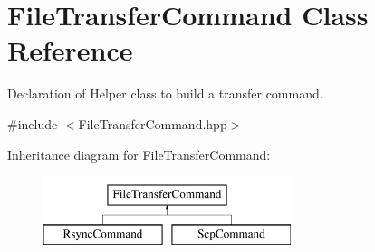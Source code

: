 \hypertarget{classFileTransferCommand}{
\section{FileTransferCommand Class Reference}
\label{classFileTransferCommand}
}


Declaration of Helper class to build a transfer command.  




{\ttfamily \#include $<$FileTransferCommand.hpp$>$}

Inheritance diagram for FileTransferCommand:\begin{figure}[H]
\begin{center}
\leavevmode
\includegraphics[height=2.000000cm]{classFileTransferCommand}
\end{center}
\end{figure}

